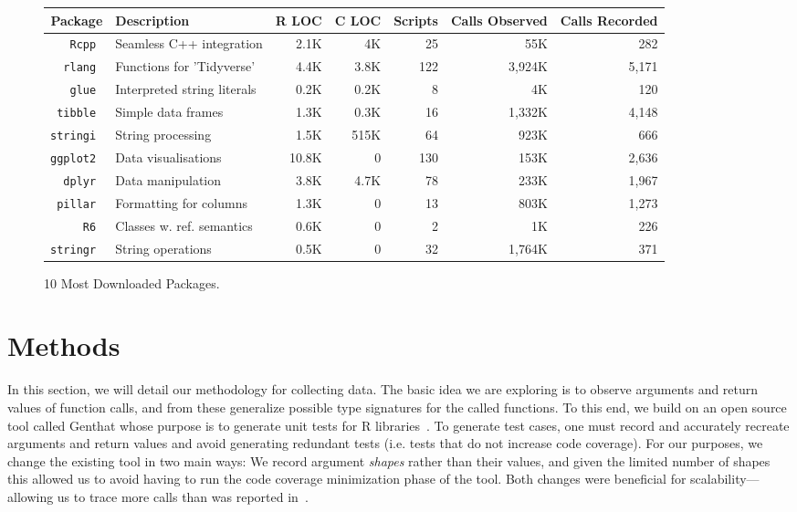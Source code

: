 \documentclass[acmsmall,10pt,review,anonymous]{acmart}\settopmatter{printfolios=true,printccs=false,printacmref=false}
\newcommand{\genthat}{{\sc Genthat}\xspace}
\begin{document}
\begin{figure}[!th]{\footnotesize\begin{tabular}{@{}r||l|r|r|r|r|r@{}}\hline
\bf Package & \bf Description & \bf R LOC &\bf C LOC &\bf Scripts & \bf Calls Observed & \bf Calls Recorded \\
\hline
\tt Rcpp  & Seamless C++ integration & 2.1K & 4K & 25 & 55K & 282 \\
\tt rlang & Functions for 'Tidyverse' & 4.4K & 3.8K & 122 & 3,924K & 5,171 \\
\tt glue  & Interpreted string literals & 0.2K & 0.2K & 8 & 4K & 120 \\
\tt tibble & Simple data frames & 1.3K & 0.3K & 16 & 1,332K & 4,148 \\
\tt stringi &  String processing & 1.5K & 515K & 64 & 923K & 666 \\
\tt ggplot2 & Data visualisations & 10.8K & 0 & 130 & 153K & 2,636\\
\tt dplyr  &  Data manipulation & 3.8K & 4.7K & 78 & 233K & 1,967 \\
\tt pillar & Formatting for columns & 1.3K & 0 & 13 & 803K & 1,273 \\
\tt R6 & Classes w. ref. semantics & 0.6K & 0 & 2 & 1K & 226 \\
\tt stringr & String operations & 0.5K & 0 & 32 & 1,764K & 371 \\
\end{tabular}}\caption{10 Most Downloaded Packages.}\label{most}
\end{figure}

\newpage
\section{Methods}

In this section, we will detail our methodology for collecting data.  The
basic idea we are exploring is to observe arguments and return values of
function calls, and from these generalize possible type signatures for the
called functions. To this end, we build on an open source tool called
\genthat whose purpose is to generate unit tests for R
libraries~\cite{issta18}.  To generate test cases, one must record and
accurately recreate arguments and return values and avoid generating
redundant tests (i.e. tests that do not increase code coverage). For our
purposes, we change the existing tool in two main ways: We record argument
\emph{shapes} rather than their values, and given the limited number of shapes
this allowed us to avoid having to run the code coverage minimization phase of
the tool. Both changes were beneficial for scalability---allowing us to
trace more calls than was reported in~\cite{issta18}.
\end{document}
